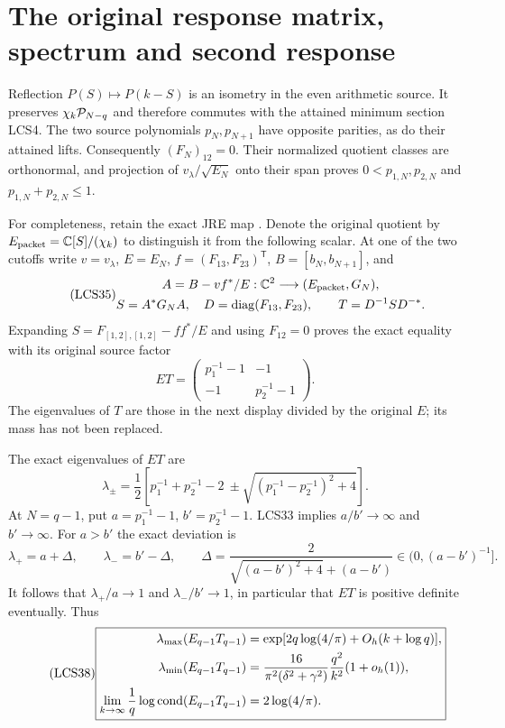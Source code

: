 \section{The original response matrix, spectrum and second response}

Reflection $P(S)\mapsto P(k-S)$ is an isometry in the even
arithmetic source. It preserves $\chi_k\mathcal P_{N-q}$ and therefore
commutes with the attained minimum section LCS4. The two source
polynomials $p_N,p_{N+1}$ have opposite parities, as do their
attained lifts. Consequently $(F_N)_{12}=0$. Their normalized
quotient classes are orthonormal, and projection of
$v_\lambda/\sqrt{E_N}$ onto their span proves
$0<p_{1,N},p_{2,N}$ and $p_{1,N}+p_{2,N}\le1$.

For completeness, retain the exact JRE map \cite{a04lcs:jre}. Denote
the original quotient by $E_{\rm packet}=\mathbb C[S]/(\chi_k)$ to
distinguish it from the following scalar. At one
of the two cutoffs write $v=v_\lambda$, $E=E_N$,
$f=(F_{13},F_{23})^{\mathsf T}$, $B=[b_N,b_{N+1}]$, and
\begin{equation}\tag{LCS35}
\begin{gathered}
 A=B-vf^*/E:\mathbb C^2\longrightarrow(E_{\rm packet},G_N),\\
 S=A^*G_NA,\quad D=\operatorname{diag}(F_{13},F_{23}),\qquad
 T=D^{-1}SD^{-*}.
\end{gathered}
\end{equation}
Expanding $S=F_{[1,2],[1,2]}-ff^*/E$ and using $F_{12}=0$
proves the exact equality with its original source factor
\begin{equation}\tag{LCS36}
 \boxed{ET=\begin{pmatrix}p_1^{-1}-1&-1\\-1&p_2^{-1}-1\end{pmatrix}.}
\end{equation}
The eigenvalues of $T$ are those in the next display divided by
the original $E$; its mass has not been replaced.

The exact eigenvalues of $ET$ are
\begin{equation}\tag{LCS37}
 \lambda_\pm=\frac12\left[p_1^{-1}+p_2^{-1}-2
       \ \pm\sqrt{(p_1^{-1}-p_2^{-1})^2+4}\right].
\end{equation}
At $N=q-1$, put $a=p_1^{-1}-1$, $b'=p_2^{-1}-1$.
LCS33 implies $a/b'\to\infty$ and $b'\to\infty$.
For $a>b'$ the exact deviation is
\[
 \lambda_+=a+\Delta,\qquad\lambda_-=b'-\Delta,\qquad
 \Delta=\frac{2}{\sqrt{(a-b')^2+4}+(a-b')}
       \in(0,(a-b')^{-1}].
\]
It follows that $\lambda_+/a\to1$ and $\lambda_-/b'\to1$,
in particular that $ET$ is positive definite eventually. Thus
\begin{equation}\tag{LCS38}
\boxed{\begin{aligned}
 \lambda_{\max}(E_{q-1}T_{q-1})
    &=\exp[2q\log(4/\pi)+O_h(k+\log q)],\\
 \lambda_{\min}(E_{q-1}T_{q-1})
    &=\frac{16}{\pi^2(\delta^2+\gamma^2)}
                    \frac{q^2}{k^2}(1+o_h(1)),\\
 \lim_{k\to\infty}\frac1q\log\operatorname{cond}(E_{q-1}T_{q-1})
    &=2\log(4/\pi).
\end{aligned}}
\end{equation}

